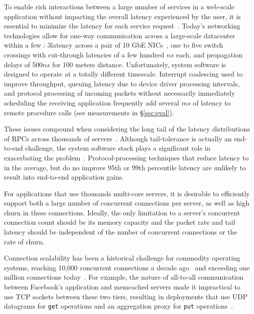  To enable rich interactions between a
large number of services in a web-scale application without impacting
the overall latency experienced by the user, it is essential to
minimize the latency for each service
request~\cite{luiz-isscc,rumble2011s}. Today's networking
technologies allow for one-way communication across a large-scale
datacenter within a few \microsecond : 3\microsecond latency across
a pair of 10 GbE NICs~\cite{cisco-sereno}, one to five switch
crossings with cut-through latencies of a few hundred $ns$ each, and
propagation delays of 500$ns$ for 100 meters distance. Unfortunately,
system software is designed to operate at a totally different
timescale. Interrupt coalescing used to improve throughput, queuing
latency due to device driver processing intervals, and protocol
processing of incoming packets without necessarily immediately
scheduling the receiving application frequently add several $ms$ of
latency to remote procedure calls (see measurements in \S\ref{sec:eval}).


These issues compound when considering the long tail of the latency
distributions of RPCs across thousands of
servers~\cite{DBLP:journals/cacm/DeanB13}. Although tail-tolerance is
actually an end-to-end challenge, the system software stack plays a
significant role in exacerbating the problem~\cite{Leverich:RHSU:2014}.
Protocol-processing techniques that reduce latency to \microsecond in
the average, but do no improve 95th or 99th percentile latency are
unlikely to result into end-to-end application gains.

 For applications that use thousands
multi-core servers, it is desirable to efficiently support both a
large number of concurrent connections per server, as well as high
churn in these connections.  Ideally, the only limitation to a
server's concurrent connection count should be its memory capacity and
the packet rate and tail latency should be independent of the nunber
of concurrent connections or the rate of churn.
 
Connection scalability has been a historical challenge for commodity
operating systems, reaching 10,000 concurrent connections a decade
ago~\cite{theC10Kproblem} and exceeding one million connections
today~\cite{theC10Mproblem}. For example, the nature of all-to-all
communication between Facebook's application and memcached servers
made it impractical to use TCP sockets between these two tiers,
resulting in deployments that use UDP datagrams for \texttt{get}
operations and an aggregation proxy for \texttt{put}
operations~\cite{nishtala2013scaling}.

